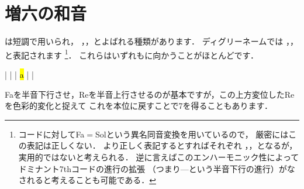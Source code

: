 \documentclass[dvipdfmx,uplatex,b5paper,openany,jbase=12Q,nomag*,textwidth-limit=44%
               ]{gachimuchi}
\begin{document}
\section{増六の和音}
は短調で用いられ，
，，とよばれる種類があります．
ディグリーネームでは
\bFlat\Gnvi{}，\bFlat\Gnvi{}，\bFlat\Gnvi{}と表記されます%
\footnote{
  コードに対してFa\aSharp$=$Sol\aFlat という異名同音変換を用いているので，%
  厳密にはこの表記は正しくない．
  より正しく表記するとすればそれぞれ
  \bFlat\Gnvi{}，\bFlat\Gnvi{}，\bFlat\Gnvi{}となるが，
  実用的ではないと考えられる．
  逆に言えばこのエンハーモニック性によってドミナント7thコードの進行の拡張
  （つまり\Gnvi\aFlat{}---\Gnv という半音下行の進行）がなされると考えることも可能である．
}．
これらはいずれも\Gnv に向かうことがほとんどです．
\begin{Music}
  \generalmeter{\meterC}%
  \Startpiece
  \NOTes%
  |%
  \en\doublebar%
  \znotes%
  |%
  \en%
  \NOTes%
  \figbassuu[\Slash{6}]%
  \zchordsl{\Gnv}%
  |%
  \en\doublebar%
  \NOTes%
  \figbassuu[5][\Slash{6}]\hl{a}%
  \zchordsl{\Gnv}%
  |%
  \en\doublebar%
  \NOTes%
  \figbassuu[3][4][\Slash{6}]%
  \zchordsl{\Gnv}%
  |%
  \en\setdoublebar%
  \endpiece%
\end{Music}

Faを半音下行させ，Re\aSharp を半音上行させるのが基本ですが，この上方変位したRe\aSharp を色彩的変化と捉えて
これを本位に戻すことで\Gnv\subsc7を得ることもあります．
\end{document}
